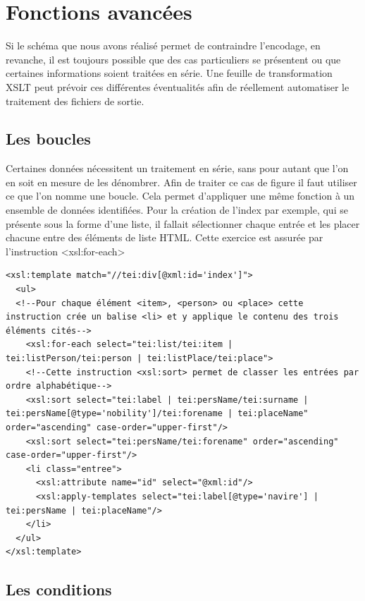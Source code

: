 \documentclass[12pt,a4paper]{book} %
\begin{document}
\section{Fonctions avancées}

Si le schéma que nous avons réalisé permet de contraindre l'encodage, en revanche, il est toujours possible que des cas particuliers se présentent ou que certaines informations soient traitées en série. Une feuille de transformation XSLT peut prévoir ces différentes éventualités afin de réellement automatiser le traitement des fichiers de sortie.

\subsection{Les boucles}

Certaines données nécessitent un traitement en série, sans pour autant que l'on en soit en mesure de les dénombrer.
Afin de traiter ce cas de figure il faut utiliser ce que l'on nomme une boucle. Cela permet d'appliquer une même fonction à un ensemble de données identifiées. Pour la création de l'index par exemple, qui se présente sous la forme d'une liste, il fallait sélectionner chaque entrée et les placer chacune entre des éléments de liste HTML. Cette exercice est assurée par l'instruction <xsl:for-each>
\bigskip

\begin{lstlisting}
<xsl:template match="//tei:div[@xml:id='index']">        
  <ul>
  <!--Pour chaque élément <item>, <person> ou <place> cette instruction crée un balise <li> et y applique le contenu des trois éléments cités-->
    <xsl:for-each select="tei:list/tei:item | tei:listPerson/tei:person | tei:listPlace/tei:place">
    <!--Cette instruction <xsl:sort> permet de classer les entrées par ordre alphabétique-->
    <xsl:sort select="tei:label | tei:persName/tei:surname | tei:persName[@type='nobility']/tei:forename | tei:placeName" order="ascending" case-order="upper-first"/>                                   
    <xsl:sort select="tei:persName/tei:forename" order="ascending" case-order="upper-first"/>
    <li class="entree">
      <xsl:attribute name="id" select="@xml:id"/>                                            
      <xsl:apply-templates select="tei:label[@type='navire'] | tei:persName | tei:placeName"/>
    </li>
  </ul>
</xsl:template>
\end{lstlisting}
\bigskip

\subsection{Les conditions}
\end{document}
